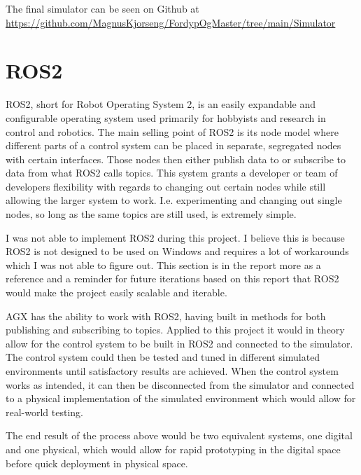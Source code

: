 The final simulator can be seen on Github at \url{https://github.com/MagnusKjorseng/FordypOgMaster/tree/main/Simulator}

\section{ROS2}
\label{sec:ros}
ROS2, short for Robot Operating System 2, is an easily expandable and configurable operating system used primarily for hobbyists and research in control and robotics. The main selling point of ROS2 is its node model where different parts of a control system can be placed in separate, segregated nodes with certain interfaces. Those nodes then either publish data to or subscribe to data from what ROS2 calls topics. This system grants a developer or team of developers flexibility with regards to changing out certain nodes while still allowing the larger system to work. I.e. experimenting and changing out single nodes, so long as the same topics are still used, is extremely simple. 

I was not able to implement ROS2 during this project. I believe this is because ROS2 is not designed to be used on Windows and requires a lot of workarounds which I was not able to figure out. This section is in the report more as a reference and a reminder for future iterations based on this report that ROS2 would make the project easily scalable and iterable. 

AGX has the ability to work with ROS2, having built in methods for both publishing and subscribing to topics. Applied to this project it would in theory allow for the control system to be built in ROS2 and connected to the simulator. The control system could then be tested and tuned in different simulated environments until satisfactory results are achieved. When the control system works as intended, it can then be disconnected from the simulator and connected to a physical implementation of the simulated environment which would allow for real-world testing. 

The end result of the process above would be two equivalent systems, one digital and one physical, which would allow for rapid prototyping in the digital space before quick deployment in physical space. 

